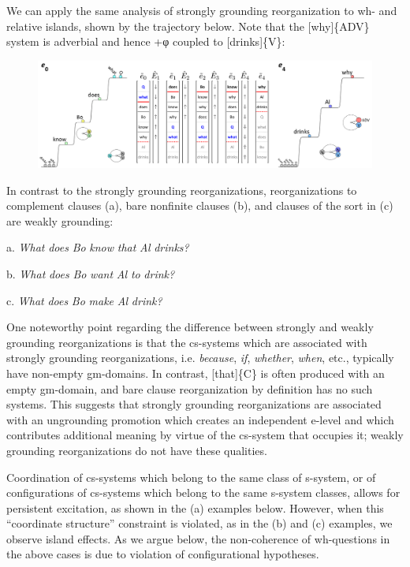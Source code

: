   We can apply the same analysis of strongly grounding reorganization to wh- and relative islands, shown by the trajectory below. Note that the [why]\{ADV\} system is adverbial and hence +φ coupled to [drinks]\{V\}:

  
\begin{figure}
\includegraphics[width=\textwidth]{figures/Tilsen-img164.png}
\caption{\missingcaption}
\label{fig:}
\end{figure}
 

  In contrast to the strongly grounding reorganizations, reorganizations to complement clauses (a), bare nonfinite clauses (b), and clauses of the sort in (c) are weakly grounding:

  a.  \textit{What} \textit{does} \textit{Bo} \textit{know} \textit{that} \textit{Al} \textit{drinks?}

  b.  \textit{What} \textit{does} \textit{Bo} \textit{want} \textit{Al} \textit{to} \textit{drink?}

  c.  \textit{What} \textit{does} \textit{Bo} \textit{make} \textit{Al} \textit{drink?}

  One noteworthy point regarding the difference between strongly and weakly grounding reorganizations is that the cs-systems which are associated with strongly grounding reorganizations, i.e. \textit{because}, \textit{if}, \textit{whether}, \textit{when}, etc., typically have non-empty gm-domains. In contrast, [that]\{C\} is often produced with an empty gm-domain, and bare clause reorganization by definition has no such systems. This suggests that strongly grounding reorganizations are associated with an ungrounding promotion which creates an independent e-level and which contributes additional meaning by virtue of the cs-system that occupies it; weakly grounding reorganizations do not have these qualities.

  Coordination of cs-systems which belong to the same class of s-system, or of configurations of cs-systems which belong to the same s-system classes, allows for persistent excitation, as shown in the (a) examples below. However, when this “coordinate structure” constraint is violated, as in the (b) and (c) examples, we observe island effects. As we argue below, the non-coherence of wh-questions in the above cases is due to violation of configurational hypotheses.

